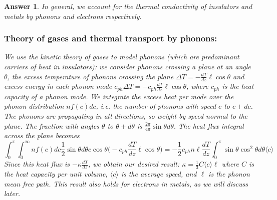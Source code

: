 \documentclass[a4paper]{article}
\newtheorem{ans}{Answer}[subsection]
\theoremstyle{new}
\begin{document}
\begin{ans}
In general, we account for the thermal conductivity of insulators and metals by phonons and electrons respectively. 
\subsubsection*{Theory of gases and thermal transport by phonons:}
We use the kinetic theory of gases to model phonons (which are predominant carriers of heat in insulators): we consider phonons crossing a plane at an angle $\theta$, the excess temperature of phonons crossing the plane $\Delta T=-\frac{dT}{dz}\ell\cos\theta$ and excess energy in each phonon mode $c_{ph}\Delta T=-c_{ph}\frac{dT}{dz}\ell\cos\theta$, where $c_{ph}$ is the heat capacity of a phonon mode. We integrate the excess heat per mode over the phonon distribution $nf(c)dc$, i.e. the number of phonons with speed $c$ to $c+dc$. The phonons are propagating in all directions, so weight by speed normal to the plane. The fraction with angles $\theta$ to $\theta+d\theta$ is $\frac{2\pi}{4\pi}\sin\theta d\theta$. The heat flux integral across the plane becomes
$$\int_0^\pi\int_0^\infty nf(c)dc\frac{1}{2}\sin\theta d\theta c\cos\theta\bigg(-c_{ph}\frac{dT}{dz}\ell\cos\theta\bigg)=-\frac{1}{2}c_{ph}n\ell\frac{dT}{dz}\int_0^\pi\sin\theta\cos^2\theta d\theta\langle c\rangle$$
Since this heat flux is $-\kappa\frac{dT}{dz}$, we obtain our desired result: $\kappa=\frac{1}{3}C\langle c\rangle \ell$ where $C$ is the heat capacity per unit volume, $\langle c\rangle$ is the average speed, and $\ell$ is the phonon mean free path. This result also holds for electrons in metals, as we will discuss later.

\end{ans}
\end{document}
